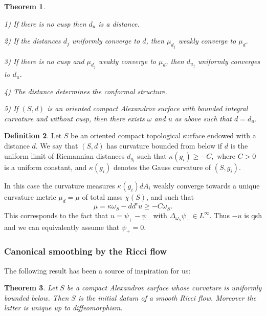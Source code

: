 \documentclass[a4paper,11pt,leqno,english]{smfart}
\theoremstyle{plain}
\newtheorem{thm}{Theorem}[section]
\theoremstyle{plain}
\numberwithin{equation}{section} %
\numberwithin{figure}{section} %
\theoremstyle{plain}
\theoremstyle{plain}
\theoremstyle{remark}
\theoremstyle{remark}
\theoremstyle{definition}
\theoremstyle{plain}
\theoremstyle{plain}
\theoremstyle{definition}
\newtheorem{defi}[thm]{Definition}
\newcommand{\p}{\psi}
\begin{document}
\begin{thm} \label{thm:recapdim1}
\text{ }

1) If there is no cusp then $d_u$ is a distance.

\smallskip

2) If the distances $d_j$  uniformly converge to $d$, then $\mu_{d_j}$ weakly converge to $\mu_d$.

\smallskip

3) If there is no cusp and $\mu_{d_j}$ weakly converge to $\mu_d$, then 
$d_{u_j}$ uniformly converges to $d_u$.

\smallskip

4) The distance determines the conformal structure.

\smallskip

5) If $(S,d)$ is an oriented compact Alexandrov surface with bounded integral curvature and without cusp, 
then there exists $\omega$ and $u$ as above
such that $d=d_u$.
\end{thm}
   
  
   \begin{defi}
  Let $S$ be an oriented compact topological surface endowed with a distance $d$.
  We say that $(S,d)$ has   curvature bounded from below if $d$ is the uniform limit
  of Riemannian distances $d_{g_i}$ such that
  $
  \kappa(g_i) \geq -C,
  $
  where $C>0$ is a uniform constant,  
  and $\kappa(g_i)$ denotes the Gauss curvature of $(S,g_i)$.
  \end{defi}
  
In this case  the curvature
 measures $\kappa(g_i) dA_i$ weakly converge towards a unique
  curvature metric $\mu_d=\mu$ of total mass $\chi(S)$, and such that
  $$
    \mu=\kappa \omega_S-dd^c u \geq -C \omega_S.
    $$
    This corresponds to the fact that $u=\p_+-\p_-$ with $\Delta_{\omega_S} \p_+ \in L^{\infty}$.
    Thus $-u$ is qsh and we can equivalently assume that $\p_+=0$.
    
    
   
 
 
 
\subsubsection{Canonical smoothing by the Ricci flow}

 The following result has been a source of inspiration for us:
 
 \begin{thm} \label{thm:richard}
 \cite{Sim12, Rich18}
 Let $S$ be a compact Alexandrov surface whose curvature is uniformly bounded below.
 Then $S$ is the initial datum of a smooth Ricci flow. Moreover the latter is unique
 up to diffeomorphism.
 \end{thm}
 
\end{document}
